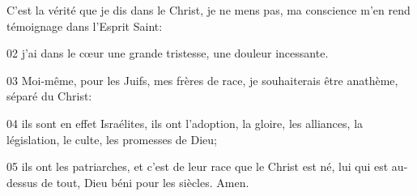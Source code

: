 C'est la vérité que je dis dans le Christ, je ne mens pas, ma conscience m'en rend témoignage dans l'Esprit Saint:

02 j’ai dans le cœur une grande tristesse, une douleur incessante.

03 Moi-même, pour les Juifs, mes frères de race, je souhaiterais être anathème, séparé du Christ:

04 ils sont en effet Israélites, ils ont l’adoption, la gloire, les alliances, la législation, le culte, les promesses de Dieu;

05 ils ont les patriarches, et c’est de leur race que le Christ est né, lui qui est au-dessus de tout, Dieu béni pour les siècles. Amen.